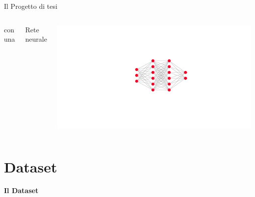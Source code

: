 \documentclass{beamer}
\begin{document}
\begin{frame}{Il Progetto di tesi}
\begin{columns}[T]
{        \begin{block}{}
          \centering\small
          con una
        \end{block}
      }
      \begin{block}{}
        \centering
        Rete neurale
      \end{block}
      \parbox[t][][c]{\textwidth}{
        \vspace*{3ex}
        \centering
        \includegraphics[width=.9\textwidth]{./Images/nn_diagram.pdf}
      }
  \end{columns}
\end{frame}

\section{Dataset}
\begin{frame}
  \centering
  \Huge\bfseries
  Il Dataset
\end{frame}
\end{document}
